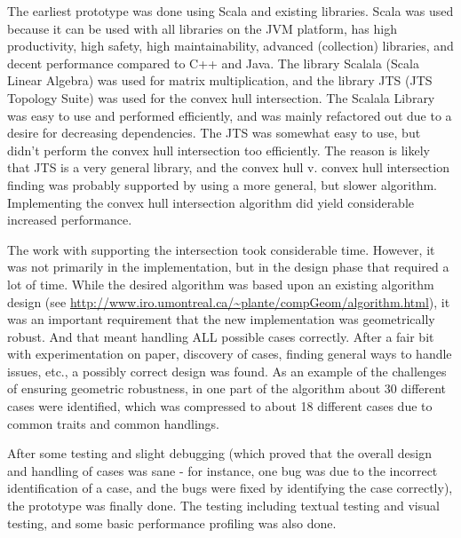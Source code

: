 The earliest prototype was done using Scala and existing libraries.
Scala was used because it can be used with all libraries on the
JVM platform, has high productivity, high safety, high maintainability,
advanced (collection) libraries,
and decent performance compared to C++ and Java.
The library Scalala (Scala Linear Algebra) was used for matrix multiplication,
and the library JTS (JTS Topology Suite) was used for the convex hull intersection.
The Scalala Library was easy to use and performed efficiently,
and was mainly refactored out due to a desire for decreasing dependencies.
The JTS was somewhat easy to use, but didn't perform the convex hull intersection
too efficiently. The reason is likely that JTS is a very general library,
and the convex hull v. convex hull intersection finding was probably supported
by using a more general, but slower algorithm.
Implementing the convex hull intersection algorithm did yield considerable increased performance.

The work with supporting the intersection took considerable time.
However, it was not primarily in the implementation, but in the design phase
that required a lot of time. While the desired algorithm was based upon
an existing algorithm design (see \url{http://www.iro.umontreal.ca/~plante/compGeom/algorithm.html}),
it was an important requirement that the new implementation was geometrically robust.
And that meant handling ALL possible cases correctly.
After a fair bit with experimentation on paper, discovery of cases,
finding general ways to handle issues, etc.,
a possibly correct design was found. As an example of the challenges
of ensuring geometric robustness, in one part of the algorithm about 30 different
cases were identified, which was compressed to about 18 different cases due to
common traits and common handlings.

After some testing and slight debugging (which proved that the overall design
and handling of cases was sane - for instance, one bug was due to the incorrect
identification of a case, and the bugs were fixed by identifying the case correctly),
the prototype was finally done. The testing including textual testing and visual
testing, and some basic performance profiling was also done.

